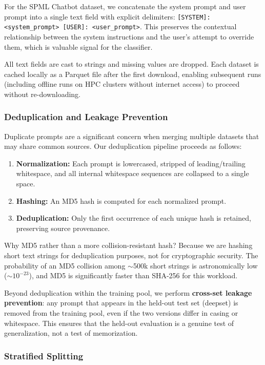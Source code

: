 \documentclass[12pt, letterpaper]{article}   %
\begin{document}
For the SPML Chatbot dataset, we concatenate the system prompt and user prompt into a single text field with explicit delimiters: \texttt{[SYSTEM]: <system\_prompt> [USER]: <user\_prompt>}. This preserves the contextual relationship between the system instructions and the user's attempt to override them, which is valuable signal for the classifier.

All text fields are cast to strings and missing values are dropped. Each dataset is cached locally as a Parquet file after the first download, enabling subsequent runs (including offline runs on HPC clusters without internet access) to proceed without re-downloading.

\subsubsection{Deduplication and Leakage Prevention}

Duplicate prompts are a significant concern when merging multiple datasets that may share common sources. Our deduplication pipeline proceeds as follows:

\begin{enumerate}
    \item \textbf{Normalization:} Each prompt is lowercased, stripped of leading/trailing whitespace, and all internal whitespace sequences are collapsed to a single space.
    \item \textbf{Hashing:} An MD5 hash is computed for each normalized prompt.
    \item \textbf{Deduplication:} Only the first occurrence of each unique hash is retained, preserving source provenance.
\end{enumerate}

Why MD5 rather than a more collision-resistant hash? Because we are hashing short text strings for deduplication purposes, not for cryptographic security. The probability of an MD5 collision among $\sim$500k short strings is astronomically low ($\sim 10^{-23}$), and MD5 is significantly faster than SHA-256 for this workload.

Beyond deduplication within the training pool, we perform \textbf{cross-set leakage prevention}: any prompt that appears in the held-out test set (deepset) is removed from the training pool, even if the two versions differ in casing or whitespace. This ensures that the held-out evaluation is a genuine test of generalization, not a test of memorization.

\subsubsection{Stratified Splitting}
\end{document}
